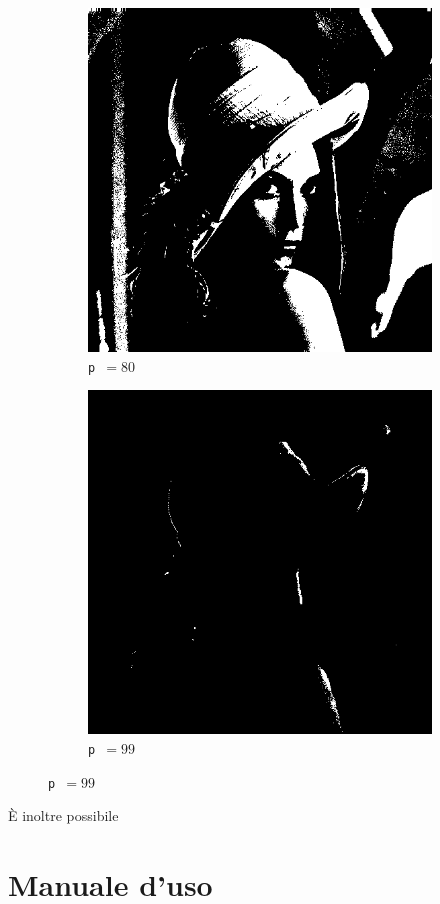 \documentclass[10pt]{article}
\begin{document}
\begin{figure}[H]
      \vspace{0.02\textwidth}

      \begin{subfigure}[b]{0.33\textwidth}
        \centering
        \includegraphics[width=\textwidth]{img/lena-threshold-80.png}
        \caption*{\texttt{p }\( = 80\)}
      \end{subfigure}
      \hspace{0.2\textwidth}
      \begin{subfigure}[b]{0.33\textwidth}
        \centering
        \includegraphics[width=\textwidth]{img/lena-threshold-99.png}
        \caption*{\texttt{p }\( = 99\)}
      \end{subfigure}
    \end{figure}

    È inoltre possibile

  \appendix
    \section{Manuale d'uso}
\end{document}

